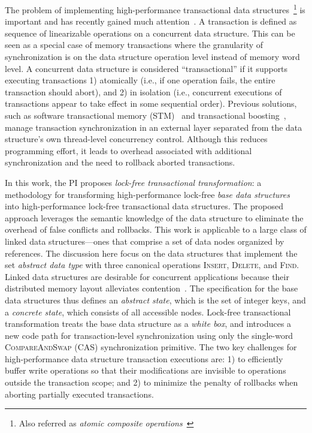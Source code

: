 The problem of implementing high-performance transactional data structures~\footnote{Also referred as \emph{atomic composite operations}~\cite{golan2013concurrent}} is important and has recently gained much attention~\cite{golan2013concurrent,bronson2010transactional,herlihy2008transactional,gramoli2013composing,golan2015automatic,hassan2014integrating,koskinen2010coarse}. 
A transaction is defined as sequence of linearizable operations on a concurrent data structure.
This can be seen as a special case of memory transactions where the granularity of synchronization is on the data structure operation level instead of memory word level.
A concurrent data structure is considered ``transactional'' if it supports executing transactions 1) atomically (i.e., if one operation fails, the entire transaction should abort), and 2) in isolation (i.e., concurrent executions of transactions appear to take effect in some sequential order).
Previous solutions, such as software transactional memory (STM)~\cite{shavit1997software,herlihy2003software} and transactional boosting~\cite{herlihy2008transactional}, manage transaction synchronization in an external layer separated from the data structure's own thread-level concurrency control. 
Although this reduces programming effort, it leads to overhead associated with additional synchronization and the need to rollback aborted transactions.
 
In this work, the PI proposes \emph{lock-free transactional transformation}: a methodology for transforming high-performance lock-free \emph{base data structures} into high-performance lock-free transactional data structures.
The proposed approach leverages the semantic knowledge of the data structure to eliminate the overhead of false conflicts and rollbacks.
This work is applicable to a large class of linked data structures---ones that comprise a set of data nodes organized by references. 
The discussion here focus on the data structures that implement the set \emph{abstract data type} with three canonical operations \textsc{Insert}, \textsc{Delete}, and \textsc{Find}.
Linked data structures are desirable for concurrent applications because their distributed memory layout alleviates contention~\cite{shavit1999scalable}.
The specification for the base data structures thus defines an \emph{abstract state}, which is the set of integer keys, and a \emph{concrete state}, which consists of all accessible nodes.
Lock-free transactional transformation treats the base data structure as a \emph{white box}, and introduces a new code path for transaction-level synchronization using only the single-word \textsc{CompareAndSwap} (CAS) synchronization primitive.
The two key challenges for high-performance data structure transaction executions are: 1) to efficiently buffer write operations so that their modifications are invisible to operations outside the transaction scope; and 2) to minimize the penalty of rollbacks when aborting partially executed transactions. 

